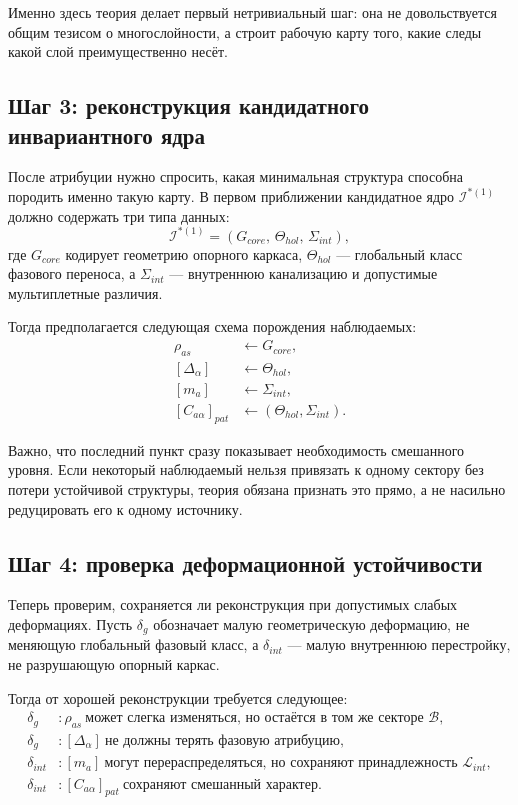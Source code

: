 \documentclass[12pt,a4paper]{article}
\begin{document}
Именно здесь теория делает первый нетривиальный шаг: она не довольствуется общим тезисом о многослойности, а строит рабочую карту того, какие следы какой слой преимущественно несёт.

\subsection{Шаг 3: реконструкция кандидатного инвариантного ядра}

После атрибуции нужно спросить, какая минимальная структура способна породить именно такую карту. В первом приближении кандидатное ядро \(\mathcal{I}^{*(1)}\) должно содержать три типа данных:
\begin{equation}
\mathcal{I}^{*(1)} = (G_{core},\, \Theta_{hol},\, \Sigma_{int}),
\end{equation}
где \(G_{core}\) кодирует геометрию опорного каркаса, \(\Theta_{hol}\) --- глобальный класс фазового переноса, а \(\Sigma_{int}\) --- внутреннюю канализацию и допустимые мультиплетные различия.

Тогда предполагается следующая схема порождения наблюдаемых:
\begin{align}
\rho_{as} &\leftarrow G_{core}, \\
[\Delta_{\alpha}] &\leftarrow \Theta_{hol}, \\
[m_a] &\leftarrow \Sigma_{int}, \\
[C_{a\alpha}]_{pat} &\leftarrow (\Theta_{hol},\Sigma_{int}).
\end{align}

Важно, что последний пункт сразу показывает необходимость смешанного уровня. Если некоторый наблюдаемый нельзя привязать к одному сектору без потери устойчивой структуры, теория обязана признать это прямо, а не насильно редуцировать его к одному источнику.

\subsection{Шаг 4: проверка деформационной устойчивости}

Теперь проверим, сохраняется ли реконструкция при допустимых слабых деформациях. Пусть \(\delta_g\) обозначает малую геометрическую деформацию, не меняющую глобальный фазовый класс, а \(\delta_{int}\) --- малую внутреннюю перестройку, не разрушающую опорный каркас.

Тогда от хорошей реконструкции требуется следующее:
\begin{align}
\delta_g &: \rho_{as}\ \text{может слегка изменяться, но остаётся в том же секторе } \mathcal{B}, \\
\delta_g &: [\Delta_{\alpha}]\ \text{не должны терять фазовую атрибуцию}, \\
\delta_{int} &: [m_a]\ \text{могут перераспределяться, но сохраняют принадлежность } \mathcal{L}_{int}, \\
\delta_{int} &: [C_{a\alpha}]_{pat}\ \text{сохраняют смешанный характер.}
\end{align}
\end{document}
